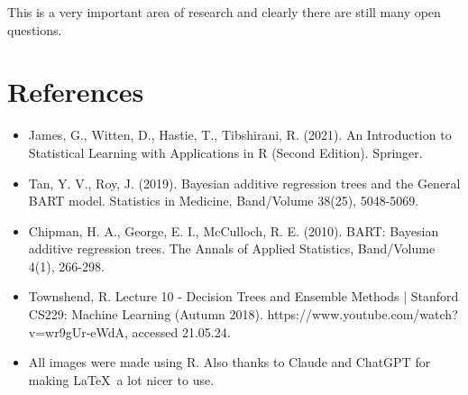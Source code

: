 \documentclass[12pt]{article}
\begin{document}

This is a very important area of research and clearly there are still many open questions.


 \section{References}
\begin{itemize}
    \item James, G., Witten, D., Hastie, T., Tibshirani, R. (2021). An Introduction to Statistical Learning with Applications in R (Second Edition). Springer.
    \item Tan, Y. V., Roy, J. (2019). Bayesian additive regression trees and the General BART model. Statistics in Medicine, Band/Volume 38(25), 5048-5069.
    \item Chipman, H. A., George, E. I., McCulloch, R. E. (2010). BART: Bayesian additive regression trees. The Annals of Applied Statistics, Band/Volume 4(1), 266-298.
    \item Townshend, R. Lecture 10 - Decision Trees and Ensemble Methods | Stanford CS229: Machine Learning (Autumn 2018). https://www.youtube.com/watch?v=wr9gUr-eWdA, accessed 21.05.24.
    \item All images were made using R. Also thanks to Claude and ChatGPT for making \LaTeX\ a lot nicer to use.
\end{itemize}
\end{document}
